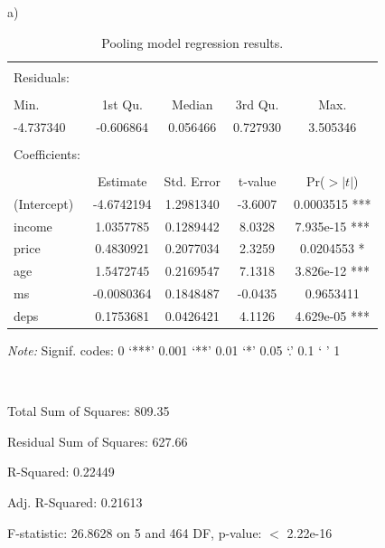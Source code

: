 \documentclass[12pt]{article}
\begin{document}
a) 

\begin{table}[!htbp] \centering 
\begin{threeparttable}
  \caption{Pooling model regression results.} 
  \label{} 
\begin{tabular}{@{\extracolsep{5pt}}lcccc} 
 \toprule
\midrule
\\
Residuals: \\
\hline \\[-1.8ex] 
     Min. &  1st Qu.  &  Median &  3rd Qu.   &   Max. \\
-4.737340 & -0.606864 & 0.056466 & 0.727930 & 3.505346 \\
 & \\ 
Coefficients: \\
\hline \\[-1.8ex] 
       &       Estimate & Std. Error & t-value  & Pr($>|t|$)  \\
(Intercept) & -4.6742194  & 1.2981340 & -3.6007 & 0.0003515 *** \\
income    &   1.0357785  & 0.1289442  & 8.0328 & 7.935e-15 *** \\
price  &      0.4830921  & 0.2077034  & 2.3259 & 0.0204553 *  \\
age     &     1.5472745 & 0.2169547 & 7.1318 & 3.826e-12 *** \\
ms      &    -0.0080364  & 0.1848487 & -0.0435 & 0.9653411   \\
deps   &      0.1753681  & 0.0426421  & 4.1126 & 4.629e-05 *** \\
\bottomrule
 \end{tabular}
 \begin{tablenotes}
\small
\item \textit{Note:} Signif. codes:  0 ‘***’ 0.001 ‘**’ 0.01 ‘*’ 0.05 ‘.’ 0.1 ‘ ’ 1
\item \ 
\item Total Sum of Squares:    809.35 
\item Residual Sum of Squares: 627.66 
\item R-Squared:      0.22449 
\item Adj. R-Squared: 0.21613 
\item F-statistic: 26.8628 on 5 and 464 DF, p-value: $<$ 2.22e-16 
\end{tablenotes}
  \end{threeparttable}
\end{table} 

\newpage
\end{document}
